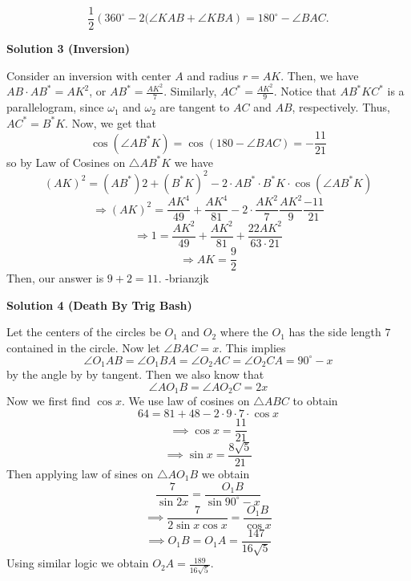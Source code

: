 \begin{enumerate}
 \[\frac12 \left(360^{\circ}-2(\angle{KAB}+\angle{KBA}\right) = 180^\circ - \angle{BAC}.\]




\textbf{Solution 3 (Inversion)}

Consider an inversion with center $A$ and radius $r=AK$. Then, we have $AB\cdot AB^*=AK^2$, or $AB^*=\frac{AK^2}{7}$. Similarly, $AC^*=\frac{AK^2}{9}$. Notice that $AB^*KC^*$ is a parallelogram, since $\omega_1$ and $\omega_2$ are tangent to $AC$ and $AB$, respectively. Thus, $AC^*=B^*K$. Now, we get that
 \[\cos(\angle AB^*K)=\cos(180-\angle BAC)=-\frac{11}{21}\]so by Law of Cosines on $\triangle AB^*K$ we have 
 \[(AK)^2=(AB^*)2+(B^*K)^2-2\cdot AB^*\cdot B^*K \cdot \cos(\angle AB^*K)\]
 \[\Rightarrow (AK)^2=\frac{AK^4}{49}+\frac{AK^4}{81}-2\cdot \frac{AK^2}{7}\frac{AK^2}{9}\frac{-11}{21}\]
 \[\Rightarrow 1=\frac{AK^2}{49}+\frac{AK^2}{81}+\frac{22AK^2}{63\cdot21}\]
 \[\Rightarrow AK=\frac{9}{2}\]Then, our answer is $9+2=\boxed{11}$. -brianzjk

 



\textbf{Solution 4 (Death By Trig Bash)}

Let the centers of the circles be $O_{1}$ and $O_{2}$ where the $O_{1}$ has the side length $7$ contained in the circle. Now let $\angle BAC =x.$ This implies 
 \[\angle O_{1}AB = \angle O_{1}BA = \angle O_{2}AC = \angle O_{2}CA = 90^{\circ}-x\] by the angle by by tangent. Then we also know that 
 \[\angle AO_{1}B = \angle AO_{2}C = 2x\] Now we first find $\cos x.$ We use law of cosines on $\bigtriangleup ABC$ to obtain 
 \[64 = 81 + 48 - 2 \cdot 9 \cdot 7 \cdot \cos{x}\] 
 \[\implies \cos{x} =\frac{11}{21}\] 
 \[\implies \sin{x} =\frac{8\sqrt{5}}{21}\] Then applying law of sines on $\bigtriangleup AO_{1}B$ we obtain 
 \[\frac{7}{\sin{2x}} =\frac{O_{1}B}{\sin{90^{\circ}-x}}\] 
 \[\implies\frac{7}{2\sin{x}\cos{x}} =\frac{O_{1}B}{\cos{x}}\] 
 \[\implies O_{1}B = O_{1}A=\frac{147}{16\sqrt{5}}\] Using similar logic we obtain $O_{2}A =\frac{189}{16\sqrt{5}}.$ 


\end{enumerate}
